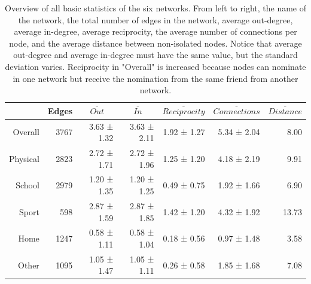     \label{table:networkGeneralStats}
    \begin{table}[h!]    
        \centering
        \caption{Overview of all basic statistics of the six networks. From left to right, the name of the network, the total number of edges in the network, average out-degree, average in-degree, average reciprocity, the average number of connections per node, and the average distance between non-isolated nodes. Notice that average out-degree and average in-degree must have the same value, but the standard deviation varies. Reciprocity in "Overall" is increased because nodes can nominate in one network but receive the nomination from the same friend from another network.}
        \footnotesize
        \renewcommand{\arraystretch}{1.7}
            \begin{tabular}{r|rrrrrr} 
            \hline
            
            \rowcolor[rgb]{1,1,0.78} \multicolumn{1}{c}{Name} & \multicolumn{1}{c}{Edges} & \multicolumn{1}{c}{$\overline{Out}$} & \multicolumn{1}{c}{$\overline{In}$} & \multicolumn{1}{c}{$\overline{Reciprocity}$} & \multicolumn{1}{c}{$\overline{Connections}$} & \multicolumn{1}{c}{$\overline{Distance}$}  \\ 
            \hline
            
            {\cellcolor[rgb]{1,0.808,0.576}}Overall           & 3767              & 3.63 ± 1.32 & 3.63 ± 2.11 & 1.92 ± 1.27 & 5.34 ± 2.04 & 8.00                                        \\
            {\cellcolor[rgb]{1,0.808,0.576}}Physical          & 2823              & 2.72 ± 1.71 & 2.72 ± 1.96 & 1.25 ± 1.20 & 4.18 ± 2.19 & 9.91                                     \\
            {\cellcolor[rgb]{1,0.808,0.576}}School            & 2979              & 1.20 ± 1.35 & 1.20 ± 1.25 & 0.49 ± 0.75 & 1.92 ± 1.66 & 6.90                                      \\
            {\cellcolor[rgb]{1,0.808,0.576}}Sport             & 598               & 2.87 ± 1.59 & 2.87 ± 1.85 & 1.42 ± 1.20 & 4.32 ± 1.92 & 13.73                                    \\
            {\cellcolor[rgb]{1,0.808,0.576}}Home              & 1247              & 0.58 ± 1.11 & 0.58 ± 1.04 & 0.18 ± 0.56 & 0.97 ± 1.48 & 3.58                                     \\
            {\cellcolor[rgb]{1,0.808,0.576}}Other             & 1095              & 1.05 ± 1.47 & 1.05 ± 1.11 & 0.26 ± 0.58 & 1.85 ± 1.68 & 7.08                                    
            \end{tabular}
    \end{table}

